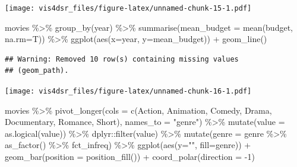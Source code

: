 \documentclass[
]{krantz}
\makeatletter
\newenvironment{Shaded}{\begin{snugshade}}{\end{snugshade}}
\newcommand{\AttributeTok}[1]{\textcolor[rgb]{0.61,0.61,0.61}{#1}}
\newcommand{\DecValTok}[1]{\textcolor[rgb]{0.06,0.06,0.06}{#1}}
\newcommand{\FunctionTok}[1]{\textcolor[rgb]{0,0,0}{#1}}
\newcommand{\NormalTok}[1]{#1}
\newcommand{\SpecialCharTok}[1]{\textcolor[rgb]{0,0,0}{#1}}
\newcommand{\StringTok}[1]{\textcolor[rgb]{0.5,0.5,0.5}{#1}}
\newenvironment{kframe}{%
\medskip{}
\setlength{\fboxsep}{.8em}
 \def\at@end@of@kframe{}%
 \ifinner\ifhmode%
  \def\at@end@of@kframe{\end{minipage}}%
  \begin{minipage}{\columnwidth}%
 \fi\fi%
 \def\FrameCommand##1{\hskip\@totalleftmargin \hskip-\fboxsep
 \colorbox{shadecolor}{##1}\hskip-\fboxsep
     \hskip-\linewidth \hskip-\@totalleftmargin \hskip\columnwidth}%
 \MakeFramed {\advance\hsize-\width
   \@totalleftmargin\z@ \linewidth\hsize
   \@setminipage}}%
 {\par\unskip\endMakeFramed%
 \at@end@of@kframe}
\renewenvironment{Shaded}{\begin{kframe}}{\end{kframe}}
\makeatother
\begin{document}
\texttt{[image: vis4dsr\_files/figure-latex/unnamed-chunk-15-1.pdf]}

\begin{Shaded}
\begin{Highlighting}[]
\NormalTok{movies }\SpecialCharTok{\%\textgreater{}\%}
  \FunctionTok{group\_by}\NormalTok{(year) }\SpecialCharTok{\%\textgreater{}\%}
  \FunctionTok{summarise}\NormalTok{(}\AttributeTok{mean\_budget =} \FunctionTok{mean}\NormalTok{(budget, }\AttributeTok{na.rm=}\NormalTok{T)) }\SpecialCharTok{\%\textgreater{}\%}
  \FunctionTok{ggplot}\NormalTok{(}\FunctionTok{aes}\NormalTok{(}\AttributeTok{x=}\NormalTok{year, }\AttributeTok{y=}\NormalTok{mean\_budget)) }\SpecialCharTok{+}
    \FunctionTok{geom\_line}\NormalTok{()}
\end{Highlighting}
\end{Shaded}

\begin{verbatim}
## Warning: Removed 10 row(s) containing missing values
## (geom_path).
\end{verbatim}

\texttt{[image: vis4dsr\_files/figure-latex/unnamed-chunk-16-1.pdf]}

\begin{Shaded}
\begin{Highlighting}[]
\NormalTok{movies }\SpecialCharTok{\%\textgreater{}\%} 
  \FunctionTok{pivot\_longer}\NormalTok{(}\AttributeTok{cols =} \FunctionTok{c}\NormalTok{(Action, Animation, Comedy, Drama, Documentary, Romance, Short), }\AttributeTok{names\_to =} \StringTok{"genre"}\NormalTok{) }\SpecialCharTok{\%\textgreater{}\%}
  \FunctionTok{mutate}\NormalTok{(}\AttributeTok{value =} \FunctionTok{as.logical}\NormalTok{(value)) }\SpecialCharTok{\%\textgreater{}\%}
\NormalTok{  dplyr}\SpecialCharTok{::}\FunctionTok{filter}\NormalTok{(value) }\SpecialCharTok{\%\textgreater{}\%}
  \FunctionTok{mutate}\NormalTok{(}\AttributeTok{genre =}\NormalTok{ genre }\SpecialCharTok{\%\textgreater{}\%}
           \FunctionTok{as\_factor}\NormalTok{() }\SpecialCharTok{\%\textgreater{}\%}
\NormalTok{           fct\_infreq) }\SpecialCharTok{\%\textgreater{}\%}
  \FunctionTok{ggplot}\NormalTok{(}\FunctionTok{aes}\NormalTok{(}\AttributeTok{y=}\StringTok{""}\NormalTok{, }\AttributeTok{fill=}\NormalTok{genre)) }\SpecialCharTok{+}
    \FunctionTok{geom\_bar}\NormalTok{(}\AttributeTok{position =} \FunctionTok{position\_fill}\NormalTok{()) }\SpecialCharTok{+}
    \FunctionTok{coord\_polar}\NormalTok{(}\AttributeTok{direction =} \SpecialCharTok{{-}}\DecValTok{1}\NormalTok{)}
\end{Highlighting}
\end{Shaded}
\end{document}
